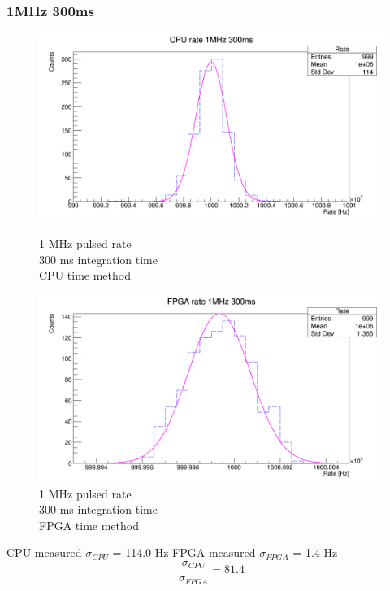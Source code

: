 \subsubsection{1MHz 300ms}
\begin{figure}[H]
	\centering
	\begin{minipage}{0.49\textwidth}
		\centering
		\includegraphics[width=.99\linewidth]{IMG/ch5/RateMeasures/CPU-time-rate-1MHz-300ms}
		\caption{1 MHz pulsed rate\\300 ms integration time\\CPU time method}
		\label{fig:CPU-time-rate-1MHz-300ms}
	\end{minipage}%
	\begin{minipage}{0.49\textwidth}
		\centering
		\includegraphics[width=.99\linewidth]{IMG/ch5/RateMeasures/FPGA-time-rate-1MHz-300ms}
		\caption{1 MHz pulsed rate\\300 ms integration time\\FPGA time method}
		\label{fig:FPGA-time-rate-1MHz-300ms}
	\end{minipage}
\end{figure}
\noindent CPU measured $\sigma_{CPU}$ = 114.0 Hz
\newline
FPGA measured $\sigma_{FPGA}$ = 1.4 Hz
\begin{equation}
	\frac{\sigma_{CPU}}{\sigma_{FPGA}} = 81.4
\end{equation}

